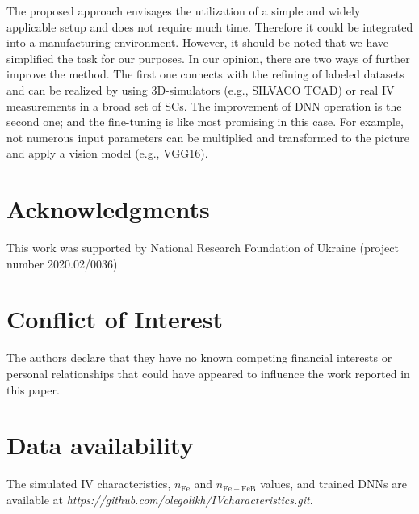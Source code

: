 \documentclass[num-refs]{wiley-article} %
\begin{document}
The proposed approach envisages
the utilization of a simple and widely applicable setup and
does not require much time.
Therefore it could be integrated into a manufacturing environment.
However, it should be noted that we have simplified the task for our purposes.
In our opinion, there are two ways of further improve the method.
The first one connects with the refining of labeled datasets and can be realized by
using 3D-simulators (e.g., SILVACO TCAD) or real IV measurements in a broad set of SCs.
The improvement of DNN operation is the second one;
and the fine-tuning is like most promising in this case.
For example,
not numerous input parameters can be multiplied and transformed to the picture and
apply a vision model (e.g., VGG16).



\section*{Acknowledgments}
This work was supported by National Research Foundation  of Ukraine
(project number 2020.02/0036)

\section*{Conflict of Interest}
The authors declare that they have no known competing financial interests or
personal relationships that could have appeared to influence the work reported
in this paper.

\section*{Data availability}

The simulated IV characteristics, $n_\mathrm{Fe}$ and $n_\mathrm{Fe-FeB}$ values,
and trained DNNs are available
at \newline
\emph{https://github.com/olegolikh/IVcharacteristics.git}.

\end{document}
